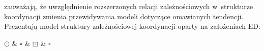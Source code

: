 \cite{przepiorkowski2023conjunct} zauważają, że uwzględnienie rozszerzonych relacji zależnościowych w~strukturze koordynacji zmienia przewidywania modeli dotyczące omawianych tendencji. Prezentują model struktury zależnościowej koordynacji oparty na założeniach ED:

\begin{exe}
\ex \label{ED-model}
\begin{dependency}[theme = simple, edge unit distance=0.5ex, baseline=-\the\dimexpr\fontdimen22\textfont2\relax]
        \begin{deptext}
        $\odot$ \& $\square$ \& $\boxdot$ \& $\square$\\
            \end{deptext}
        \end{dependency}
\end{exe}






